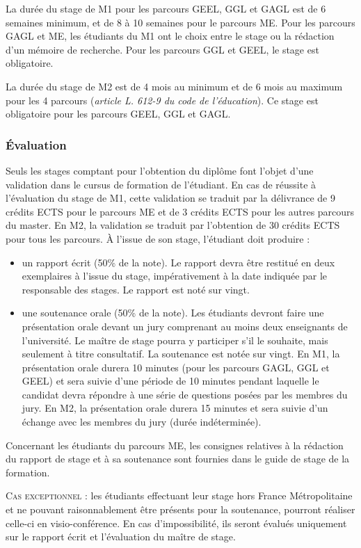 \documentclass[a4paper,11pt]{article}
\begin{document}
La durée du stage de M1 pour les parcours GEEL, GGL et GAGL est de 6 semaines minimum, et de 8 à 10 semaines pour le parcours ME. Pour les parcours GAGL et ME, les étudiants du M1 ont le choix entre le stage ou la rédaction d'un mémoire de recherche. Pour les parcours GGL et GEEL, le stage est obligatoire. 

La durée du stage de M2 est de 4 mois au minimum et de 6 mois au maximum pour les 4 parcours (\emph{article L. 612-9 du code de l'éducation}). Ce stage est obligatoire pour les parcours GEEL, GGL et GAGL.

\subsubsection{Évaluation}
Seuls les stages comptant pour l'obtention du diplôme font l'objet d'une validation dans le cursus de formation de l'étudiant. En cas de réussite à l'évaluation du stage de M1, cette validation se traduit par la délivrance de 9 crédits ECTS pour le parcours ME et de 3 crédits ECTS pour les autres parcours du master. En M2, la validation se traduit par l'obtention de 30 crédits ECTS pour tous les parcours. À l'issue de son stage, l'étudiant doit produire :
\begin{itemize}
	\item un rapport écrit (50\% de la note). Le rapport devra être restitué en deux exemplaires à l'issue du stage, impérativement à la date indiquée par le responsable des stages. Le rapport est noté sur vingt.
	\item une soutenance orale (50\% de la note). Les étudiants devront faire une présentation orale devant un jury comprenant au moins deux enseignants de l'université. Le maître de stage pourra y participer s'il le souhaite, mais seulement à titre consultatif. La soutenance est notée sur vingt. En M1, la présentation orale durera 10 minutes (pour les parcours GAGL, GGL et GEEL) et sera suivie d'une période de 10 minutes pendant laquelle le candidat devra répondre à une série de questions posées par les membres du jury. En M2, la présentation orale durera 15 minutes et sera suivie d'un échange avec les membres du jury (durée indéterminée).
\end{itemize}

Concernant les étudiants du parcours ME, les consignes relatives à la rédaction du rapport de stage et à sa soutenance sont fournies dans le guide de stage de la formation.

\textsc{Cas exceptionnel} : les étudiants effectuant leur stage hors France Métropolitaine et ne pouvant raisonnablement être présents pour la soutenance, pourront réaliser celle-ci en visio-conférence. En cas d'impossibilité, ils seront évalués uniquement sur le rapport écrit et l'évaluation du maître de stage.
\end{document}
